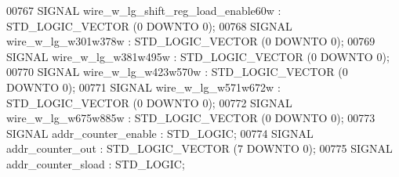 \begin{DoxyCode}
{00767      \textcolor{keywordflow}{SIGNAL}  \textcolor{vhdlchar}{wire_w_lg_shift_reg_load_enable60w} \textcolor{vhdlchar}{:}   \textcolor{comment}{STD\_LOGIC\_VECTOR} \textcolor{vhdlchar}{(}\textcolor{vhdllogic}{}\textcolor{vhdllogic}{0} \textcolor{keywordflow}{DOWNTO} \textcolor{vhdllogic}{}\textcolor{vhdllogic}{0}\textcolor{vhdlchar}{)};
00768      \textcolor{keywordflow}{SIGNAL}  \textcolor{vhdlchar}{wire_w_lg_w301w378w}    \textcolor{vhdlchar}{:}   \textcolor{comment}{STD\_LOGIC\_VECTOR} \textcolor{vhdlchar}{(}\textcolor{vhdllogic}{}\textcolor{vhdllogic}{0} \textcolor{keywordflow}{DOWNTO} \textcolor{vhdllogic}{}\textcolor{vhdllogic}{0}\textcolor{vhdlchar}{)};
00769      \textcolor{keywordflow}{SIGNAL}  \textcolor{vhdlchar}{wire_w_lg_w381w495w}    \textcolor{vhdlchar}{:}   \textcolor{comment}{STD\_LOGIC\_VECTOR} \textcolor{vhdlchar}{(}\textcolor{vhdllogic}{}\textcolor{vhdllogic}{0} \textcolor{keywordflow}{DOWNTO} \textcolor{vhdllogic}{}\textcolor{vhdllogic}{0}\textcolor{vhdlchar}{)};
00770      \textcolor{keywordflow}{SIGNAL}  \textcolor{vhdlchar}{wire_w_lg_w423w570w}    \textcolor{vhdlchar}{:}   \textcolor{comment}{STD\_LOGIC\_VECTOR} \textcolor{vhdlchar}{(}\textcolor{vhdllogic}{}\textcolor{vhdllogic}{0} \textcolor{keywordflow}{DOWNTO} \textcolor{vhdllogic}{}\textcolor{vhdllogic}{0}\textcolor{vhdlchar}{)};
00771      \textcolor{keywordflow}{SIGNAL}  \textcolor{vhdlchar}{wire_w_lg_w571w672w}    \textcolor{vhdlchar}{:}   \textcolor{comment}{STD\_LOGIC\_VECTOR} \textcolor{vhdlchar}{(}\textcolor{vhdllogic}{}\textcolor{vhdllogic}{0} \textcolor{keywordflow}{DOWNTO} \textcolor{vhdllogic}{}\textcolor{vhdllogic}{0}\textcolor{vhdlchar}{)};
00772      \textcolor{keywordflow}{SIGNAL}  \textcolor{vhdlchar}{wire_w_lg_w675w885w}    \textcolor{vhdlchar}{:}   \textcolor{comment}{STD\_LOGIC\_VECTOR} \textcolor{vhdlchar}{(}\textcolor{vhdllogic}{}\textcolor{vhdllogic}{0} \textcolor{keywordflow}{DOWNTO} \textcolor{vhdllogic}{}\textcolor{vhdllogic}{0}\textcolor{vhdlchar}{)};
00773      \textcolor{keywordflow}{SIGNAL}  \textcolor{vhdlchar}{addr_counter_enable} \textcolor{vhdlchar}{:}  \textcolor{comment}{STD\_LOGIC};
00774      \textcolor{keywordflow}{SIGNAL}  \textcolor{vhdlchar}{addr_counter_out} \textcolor{vhdlchar}{:} \textcolor{comment}{STD\_LOGIC\_VECTOR} \textcolor{vhdlchar}{(}\textcolor{vhdllogic}{}\textcolor{vhdllogic}{7} \textcolor{keywordflow}{DOWNTO} \textcolor{vhdllogic}{}\textcolor{vhdllogic}{0}\textcolor{vhdlchar}{)};
00775      \textcolor{keywordflow}{SIGNAL}  \textcolor{vhdlchar}{addr_counter_sload} \textcolor{vhdlchar}{:}   \textcolor{comment}{STD\_LOGIC};
}
\end{DoxyCode}
